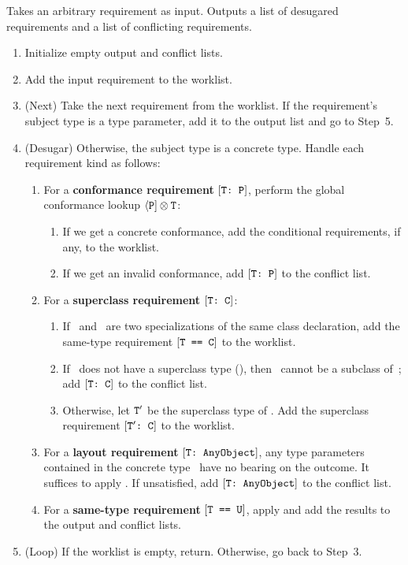 \documentclass[../generics]{subfiles}
\begin{document}
\begin{algorithm}\label{requirement desugaring algorithm}
Takes an arbitrary requirement as input. Outputs a list of desugared requirements and a list of conflicting requirements.
\begin{enumerate}
\item Initialize empty output and conflict lists.
\item Add the input requirement to the worklist.
\item (Next) Take the next requirement from the worklist. If the requirement's subject type is a type parameter, add it to the output list and go to Step~5.
\item (Desugar) Otherwise, the subject type is a concrete type. Handle each requirement kind as follows:
\begin{enumerate}
\item For a \textbf{conformance requirement} $[\texttt{T:~P}]$, perform the global conformance lookup $\langle\texttt{P}]\otimes\texttt{T}$:
\begin{enumerate}
\item If we get a concrete conformance, add the conditional requirements, if any, to the worklist.
\item If we get an invalid conformance, add $[\texttt{T:~P}]$ to the conflict list.
\end{enumerate}
\item For a \textbf{superclass requirement} $[\texttt{T:~C}]$:
\begin{enumerate}
\item If \tT\ and \tC\ are two specializations of the same class declaration, add the same-type requirement $[\texttt{T == C}]$ to the worklist.
\item If \tT\ does not have a superclass type (), then \tT\ cannot be a subclass of~\tC; add $[\texttt{T:~C}]$ to the conflict list.
\item Otherwise, let $\texttt{T}'$ be the superclass type of \tT. Add the superclass requirement $[\texttt{$\texttt{T}'$:~C}]$ to the worklist.
\end{enumerate}
\item For a \textbf{layout requirement} $[\texttt{T:~AnyObject}]$, any type parameters contained in the concrete type \tT\ have no bearing on the outcome. It suffices to apply . If unsatisfied, add $[\texttt{T:~AnyObject}]$ to the conflict list.
\item For a \textbf{same-type requirement} $[\texttt{T == U}]$, apply  and add the results to the output and conflict lists.
\end{enumerate}
\item (Loop) If the worklist is empty, return. Otherwise, go back to Step~3.
\end{enumerate}
\end{algorithm}
\end{document}
